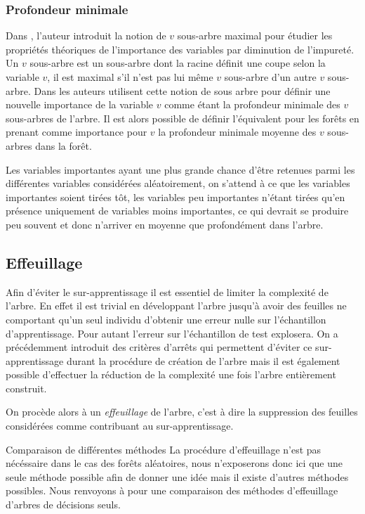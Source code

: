 \subsubsection{Profondeur minimale}

Dans \citet{Ishwaran2007}, l'auteur introduit la notion de $v$ sous-arbre maximal pour étudier les propriétés théoriques de l'importance des variables par diminution de l'impureté. Un $v$ sous-arbre est un sous-arbre dont la racine définit une coupe selon la variable $v$, il est maximal s’il n'est pas lui même $v$ sous-arbre d'un autre $v$ sous-arbre.
Dans \citet{Ishwaran2010a} les auteurs utilisent cette notion de sous arbre pour définir une nouvelle importance de la variable $v$ comme étant la profondeur minimale des $v$ sous-arbres de l'arbre. Il est alors possible de définir l'équivalent pour les forêts en prenant comme importance pour $v$ la profondeur minimale moyenne des $v$ sous-arbres dans la forêt.

Les variables importantes ayant une plus grande chance d'être retenues parmi les différentes variables considérées aléatoirement, on s'attend à ce que les variables importantes soient tirées tôt, les variables peu importantes n'étant tirées qu'en présence uniquement de variables moins importantes, ce qui devrait se produire peu souvent et donc n'arriver en moyenne que profondément dans l'arbre.


\subsection{Effeuillage}

Afin d'éviter le sur-apprentissage il est essentiel de limiter la complexité de l'arbre. En effet il est trivial en développant l'arbre jusqu'à avoir des feuilles ne comportant qu'un seul individu d'obtenir une erreur nulle sur l'échantillon d'apprentissage. Pour autant l'erreur sur l'échantillon de test explosera.
On a précédemment introduit des critères d'arrêts qui permettent d'éviter ce sur-apprentissage durant la procédure de création de l'arbre mais il est également possible d'effectuer la réduction de la complexité une fois l'arbre entièrement construit.

On procède alors à un \emph{effeuillage} de l'arbre, c'est à dire la suppression des feuilles considérées comme contribuant au sur-apprentissage.

\begin{remark}{Comparaison de différentes méthodes}
    La procédure d'effeuillage n'est pas nécéssaire dans le cas des forêts aléatoires, nous n'exposerons donc ici que une seule méthode possible afin de donner une idée mais il existe d'autres méthodes possibles. Nous renvoyons à \citet{Mingers1989} pour une comparaison des méthodes d'effeuillage d'arbres de décisions seuls.
\end{remark}

